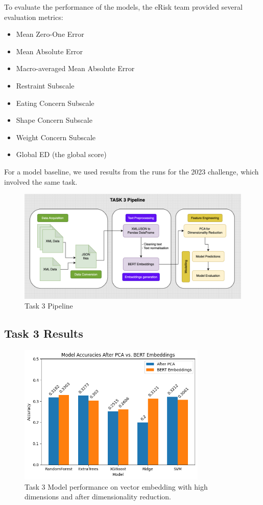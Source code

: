 \documentclass[]{style/ceurart}
\begin{document}
To evaluate the performance of the models, the eRisk team provided several evaluation metrics:
\begin{itemize}
    \item Mean Zero-One Error
    \item Mean Absolute Error
    \item Macro-averaged Mean Absolute Error
    \item Restraint Subscale
    \item Eating Concern Subscale
    \item Shape Concern Subscale
    \item Weight Concern Subscale
    \item Global ED (the global score)
\end{itemize}

For a model baseline, we used results from the runs for the 2023 challenge, which involved the same task.

\begin{figure}[h]
\centering
\includegraphics[width=\textwidth]{Task3Pipeline.png}
\caption{Task 3 Pipeline}
\label{fig:example}
\end{figure}

\subsection{Task 3 Results}

\begin{figure}[h]
\centering
\includegraphics[width=0.8\textwidth]{task3ModelRes.png}
\caption{Task 3 Model performance on vector embedding with high dimensions and after dimensionality reduction.}
\label{fig:example}
\end{figure}
\end{document}
